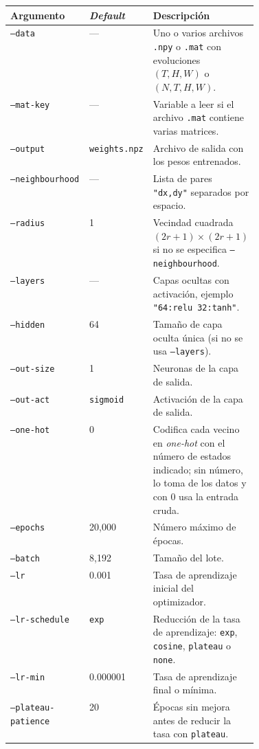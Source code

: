 \begin{table}[H]
    \centering
    \footnotesize
    \begin{tabular}{l|l|p{0.42\linewidth}}
        \hline
        \textbf{Argumento} & \textbf{\textit{Default}} & \textbf{Descripción} \\ \hline
        \texttt{--data} & --- & Uno o varios archivos \texttt{.npy} o \texttt{.mat} con evoluciones $(T, H, W)$ o $(N, T, H, W)$. \\ \hline
        \texttt{--mat-key} & --- & Variable a leer si el archivo \texttt{.mat} contiene varias matrices. \\ \hline
        \texttt{--output} & \texttt{weights.npz} & Archivo de salida con los pesos entrenados. \\ \hline
        \texttt{--neighbourhood} & --- & Lista de pares \texttt{"dx,dy"} separados por espacio. \\ \hline
        \texttt{--radius} & 1 & Vecindad cuadrada $(2r+1) \times (2r+1)$ si no se especifica \texttt{--neighbourhood}. \\ \hline
        \texttt{--layers} & --- & Capas ocultas con activación, ejemplo \texttt{"64:relu 32:tanh"}. \\ \hline
        \texttt{--hidden} & 64 & Tamaño de capa oculta única (si no se usa \texttt{--layers}). \\ \hline
        \texttt{--out-size} & 1 & Neuronas de la capa de salida. \\ \hline
        \texttt{--out-act} & \texttt{sigmoid} & Activación de la capa de salida. \\ \hline
        \texttt{--one-hot} & 0 & Codifica cada vecino en \textit{one-hot} con el número de estados indicado; sin número, lo toma de los datos y con 0 usa la entrada cruda. \\ \hline
        \texttt{--epochs} & 20,000 & Número máximo de épocas. \\ \hline
        \texttt{--batch} & 8,192 & Tamaño del lote. \\ \hline
        \texttt{--lr} & 0.001 & Tasa de aprendizaje inicial del optimizador. \\ \hline
        \texttt{--lr-schedule} & \texttt{exp} & Reducción de la tasa de aprendizaje: \texttt{exp}, \texttt{cosine}, \texttt{plateau} o \texttt{none}. \\ \hline
        \texttt{--lr-min} & 0.000001 & Tasa de aprendizaje final o mínima. \\ \hline
        \texttt{--plateau-patience} & 20 & Épocas sin mejora antes de reducir la tasa con \texttt{plateau}. \\ \hline

\end{tabular}
\end{table}
